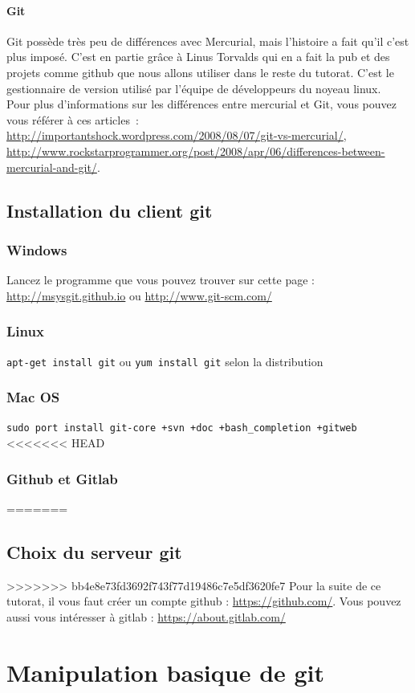 \documentclass[a4paper,10pt]{report}
\begin{document}
      \subsubsection{Git}
Git possède très peu de différences avec Mercurial, mais l'histoire a fait qu'il c'est plus imposé.
C'est en partie grâce à Linus Torvalds qui en a fait la pub et des projets comme github que nous allons utiliser dans le reste du tutorat.
C'est le gestionnaire de version utilis\'e par l'\'equipe de d\'eveloppeurs du noyeau linux.\\

Pour plus d'informations sur les différences entre mercurial et Git, vous pouvez vous référer à ces articles~: \url{http://importantshock.wordpress.com/2008/08/07/git-vs-mercurial/}, \url{http://www.rockstarprogrammer.org/post/2008/apr/06/differences-between-mercurial-and-git/}.
  \section{Installation du client git}
    \subsection{Windows}
Lancez le programme que vous pouvez trouver sur cette page : \url{http://msysgit.github.io} ou \url{http://www.git-scm.com/}
    \subsection{Linux}
\verb|apt-get install git| ou \verb|yum install git| selon la distribution
    \subsection{Mac OS}
\verb|sudo port install git-core +svn +doc +bash_completion +gitweb|
<<<<<<< HEAD
  \subsection{Github et Gitlab}
=======
  \section{Choix du serveur git}
>>>>>>> bb4e8e73fd3692f743f77d19486c7e5df3620fe7
Pour la suite de ce tutorat, il vous faut créer un compte github : \url{https://github.com/}.
Vous pouvez aussi vous intéresser à gitlab : \url{https://about.gitlab.com/}

\chapter{Manipulation basique de git}
\end{document}

